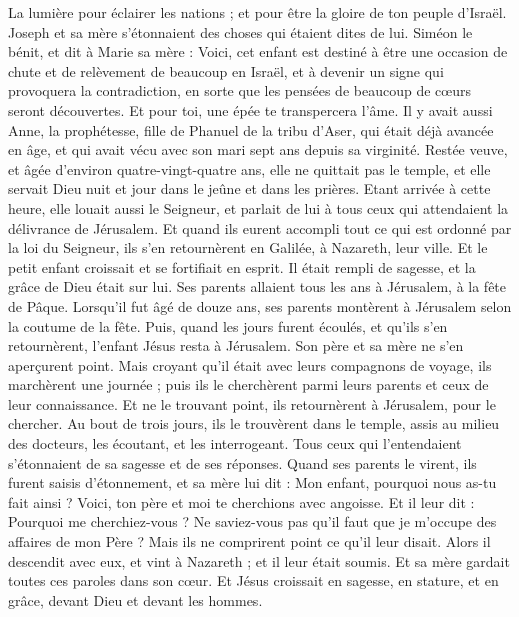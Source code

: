 \begin{multicols}{2}
La lumière pour éclairer les nations ; et pour être la gloire de ton peuple d'Israël.
Joseph et sa mère s'étonnaient des choses qui étaient dites de lui.
Siméon le bénit, et dit à Marie sa mère : Voici, cet enfant est destiné à être une occasion de chute et de relèvement de beaucoup en Israël, et à devenir un signe qui provoquera la contradiction,
en sorte que les pensées de beaucoup de cœurs seront découvertes. Et pour toi, une épée te transpercera l’âme.
Il y avait aussi Anne, la prophétesse, fille de Phanuel de la tribu d'Aser, qui était déjà avancée en âge, et qui avait vécu avec son mari sept ans depuis sa virginité.
Restée veuve, et âgée d’environ quatre-vingt-quatre ans, elle ne quittait pas le temple, et elle servait Dieu nuit et jour dans le jeûne et dans les prières.
Etant arrivée à cette heure, elle louait aussi le Seigneur, et parlait de lui à tous ceux qui attendaient la délivrance de Jérusalem.
Et quand ils eurent accompli tout ce qui est ordonné par la loi du Seigneur, ils s'en retournèrent en Galilée, à Nazareth, leur ville.
Et le petit enfant croissait et se fortifiait en esprit. Il était rempli de sagesse, et la grâce de Dieu était sur lui.
Ses parents allaient tous les ans à Jérusalem, à la fête de Pâque.
Lorsqu’il fut âgé de douze ans, ses parents montèrent à Jérusalem selon la coutume de la fête.
Puis, quand les jours furent écoulés, et qu’ils s’en retournèrent, l’enfant Jésus resta à Jérusalem. Son père et sa mère ne s'en aperçurent point.
Mais croyant qu'il était avec leurs compagnons de voyage, ils marchèrent une journée ; puis ils le cherchèrent parmi leurs parents et ceux de leur connaissance.
Et ne le trouvant point, ils retournèrent à Jérusalem, pour le chercher.
Au bout de trois jours, ils le trouvèrent dans le temple, assis au milieu des docteurs, les écoutant, et les interrogeant.
Tous ceux qui l'entendaient s'étonnaient de sa sagesse et de ses réponses.
Quand ses parents le virent, ils furent saisis d’étonnement, et sa mère lui dit : Mon enfant, pourquoi nous as-tu fait ainsi ? Voici, ton père et moi te cherchions avec angoisse.
Et il leur dit : Pourquoi me cherchiez-vous ? Ne saviez-vous pas qu'il faut que je m’occupe des affaires de mon Père ?
Mais ils ne comprirent point ce qu'il leur disait.
Alors il descendit avec eux, et vint à Nazareth ; et il leur était soumis. Et sa mère gardait toutes ces paroles dans son cœur.
Et Jésus croissait en sagesse, en stature, et en grâce, devant Dieu et devant les hommes.

\end{multicols}
